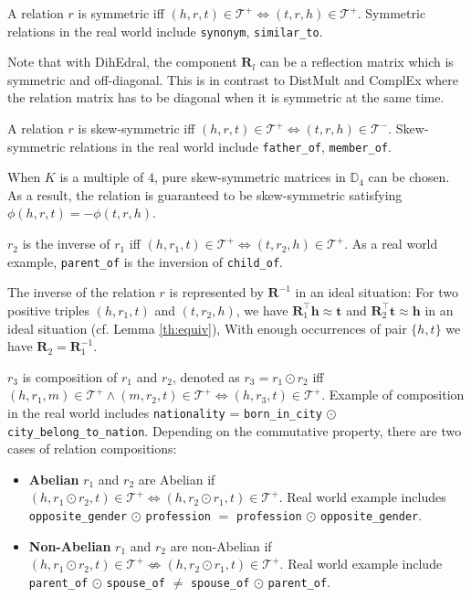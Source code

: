 \documentclass[11pt,a4paper]{article}
\begin{document}
\begin{description}[leftmargin=0cm]
\item[Symmetric]  A relation $r$ is symmetric iff $(h, r, t) \in \mathcal{T}^{+} \Leftrightarrow (t,r,h) \in \mathcal{T}^{+}$. Symmetric relations in the real world include \verb|synonym|, \verb|similar_to|.

Note that with DihEdral, the component $\bm{R}_l$ can be a reflection matrix which is symmetric and off-diagonal. This is in contrast to DistMult and ComplEx where the relation matrix has to be diagonal when it is symmetric at the same time.

\item[Skew-Symmetric]  A relation $r$ is skew-symmetric iff $(h, r, t) \in \mathcal{T}^{+}\Leftrightarrow (t,r,h) \in \mathcal{T}^{-}$. Skew-symmetric relations in the real world include \verb|father_of|, \verb|member_of|.

When $K$ is a multiple of $4$, pure skew-symmetric matrices in $\mathbb{D}_4$ can be chosen. As a result, the relation is guaranteed to be skew-symmetric satisfying $\phi(h,r,t)= -\phi(t,r,h)$.



\end{description}
\begin{description}[leftmargin=0cm]
\item[Inversion]  $r_2$ is the inverse of $r_1$ iff $(h, r_1, t) \in \mathcal{T}^{+} \Leftrightarrow (t, r_2, h) \in \mathcal{T}^{+}$. As a real world example, \verb|parent_of| is the inversion of \verb|child_of|.

The inverse of the relation $r$ is represented by $\bm{R}^{-1}$ in an ideal situation: For two positive triples $(h, r_1, t)$ and $(t, r_2, h)$, we have $\bm{R}_1^{\top}\bm{h}\approx \bm{t}$ and $\bm{R}_2^\top\bm{t}\approx \bm{h}$ in an ideal situation  (cf. Lemma \ref{th:equiv}), With enough occurrences of pair $\{h,t\}$ we have $\bm{R}_2=\bm{R}_1^{-1}$.

\item[Composition]  $r_3$ is composition of $r_1$ and $r_2$, denoted as $r_3=r_1\odot r_2$ iff $(h, r_1, m) \in \mathcal{T}^{+} \wedge (m, r_2, t) \in \mathcal{T}^{+} \Leftrightarrow (h, r_3, t) \in \mathcal{T}^{+}$. Example of composition in the real world includes \verb|nationality| = \verb|born_in_city| $\odot$ \verb|city_belong_to_nation|. Depending on the commutative property, there are two cases of relation compositions:
\begin{itemize}
    \item \textbf{Abelian} $r_1$ and $r_2$ are Abelian if $(h, r_1 \odot r_2, t) \in \mathcal{T}^{+} \Leftrightarrow  (h, r_2 \odot r_1, t) \in \mathcal{T}^{+}$. Real world example includes \verb|opposite_gender| $\odot$ \verb|profession| $=$ \verb|profession| $\odot$ \verb|opposite_gender|.
    \item \textbf{Non-Abelian} $r_1$ and $r_2$ are non-Abelian if $(h, r_1 \odot r_2, t) \in \mathcal{T}^{+} \nLeftrightarrow  (h, r_2 \odot r_1, t) \in \mathcal{T}^{+}$. Real world example include \verb|parent_of| $\odot$ \verb|spouse_of| $\ne$ \verb|spouse_of| $\odot$ \verb|parent_of|.
\end{itemize}
\end{description}
\end{document}
